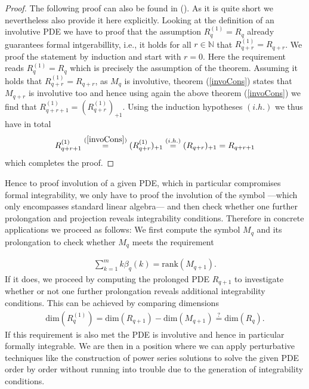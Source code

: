 \begin{proof}
The following proof can also be found in (\cite{seiler1994analysis}). As it is quite short we nevertheless also provide it here explicitly.
Looking at the definition of an involutive PDE we have to proof that the assumption $R_q^{(1)} = R_q$ already guarantees formal intgerabillity, i.e., it holds for all $r \in \mathbb{N}$ that $R_{q+r}^{(1)} = R_{q+r}$. We proof the statement by induction and start with $r=0$. Here the requirement reads $R_q^{(1)}=R_q$ which is precisely the assumption of the theorem. Assuming it holds that $R_{q+r}^{(1)}=R_{q+r}$, as $M_q$ is involutive, theorem (\ref{invoCons}) states that $M_{q+r}$ is involutive too and hence using again the above theorem (\ref{invoCons}) we find that $R_{q+r+1}^{(1)}= (R_{q+r}^{(1)})_{+1}$. Using the induction hypotheses $(i.h.)$ we thus have in total
\begin{align}
   R_{q+r+1}^{(1)} \overset{(\ref{invoCons})}{=} (R_{q+r}^{(1)})_{+1} \overset{(i.h.)}{=} (R_{q+r})_{+1} = R_{q+r+1} 
\end{align}
which completes the proof. 
\end{proof}
Hence to proof involution of a given PDE, which in  particular compromises formal integrability, we only have to proof the involution of the symbol ---which only encompasses standard linear algebra--- and then check whether one further prolongation and projection reveals integrability conditions. Therefore in concrete applications we proceed as follows: We first compute the symbol $M_q$ and its prolongation to check whether $M_q$ meets the requirement 

\begin{align}
        \sum_{k=1}^m k\beta_q(k) = \mathrm{rank}(M_{q+1}).
\end{align}
If it does, we proceed by computing the prolonged PDE $R_{q+1}$ to investigate whether or not one further prolongation reveals additional integrability conditions. This can be achieved by comparing dimensions
\begin{align}
    \mathrm{dim}(R_q^{(1)}) = \mathrm{dim}(R_{q+1}) - \mathrm{dim}(M_{q+1}) \stackrel{?}{=} \mathrm{dim}(R_q).
\end{align}
If this requirement is also met the PDE is involutive and hence in particular formally integrable. We are then in a position where we can apply perturbative techniques like the construction of power series solutions to solve the given PDE order by order without running into trouble due to the generation of integrability conditions.


